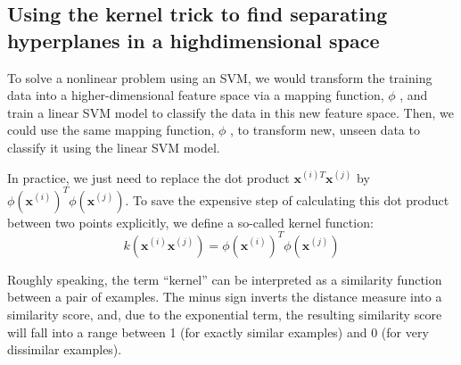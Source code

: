 \subsection{Using the kernel trick to find separating hyperplanes in a highdimensional space}
To solve a nonlinear problem using an SVM, we would transform the training data into a higher-dimensional feature space via a mapping function, $\phi$ , and train a linear SVM model to classify the data in this new feature space. Then, we could use the same mapping function, $\phi$ , to transform new, unseen data to classify it using the linear SVM model.

In practice, we just need to replace the dot product $\textbf{x}^{(i)T}\textbf{x}^{(j)}$ by $\phi(\textbf{x}^{(i)})^T\phi(\textbf{x}^{(j)})$. To save the expensive step of calculating this dot product between two points explicitly, we define a so-called kernel function:
$$k(\textbf{x}^{(i)}\textbf{x}^{(j)})=\phi(\textbf{x}^{(i)})^T\phi(\textbf{x}^{(j)})$$

Roughly speaking, the term “kernel” can be interpreted as a similarity function between a pair of examples. The minus sign inverts the distance measure into a similarity score, and, due to the exponential term, the resulting similarity score will fall into a range between 1 (for exactly similar examples) and 0 (for very dissimilar examples).